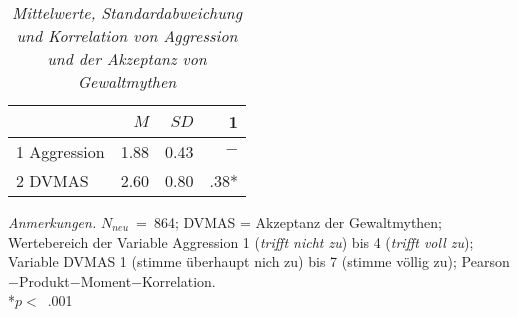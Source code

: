 \begin{table}[htb]
    \caption[Mittelwerte, Standardabweichung und Korrelation von Aggression und der Akzeptanz von Gewaltmythen]{\textit {Mittelwerte, Standardabweichung und Korrelation von Aggression und der Akzeptanz von Gewaltmythen}} 
    \label{H2_Pearson}
    \centering
    \begin{adjustbox}{width=5.5cm} %
    \small
    \begin{tabular}{lrrr}
      \hline
        & $M$   & $SD$ & 1 \\
      \hline
    1 Aggression      & 1.88 & 0.43  & $-$      \\
    2 DVMAS           & 2.60 & 0.80  & .38*      \\
       \hline
    \end{tabular}
    \end{adjustbox}
    
    \begin{tablenotes}
        \item \textit{Anmerkungen.} \( N_{neu} \)~=~864; DVMAS = Akzeptanz der Gewaltmythen; Wertebereich der Variable Aggression 1 (\textit{trifft nicht zu}) bis 4 (\textit{trifft voll zu}); Variable DVMAS 1 (stimme überhaupt nich zu) bis 7 (stimme völlig zu); Pearson$-$Produkt$-$Moment$-$Korrelation. \\ *$p<$~.001
      \end{tablenotes}
    \end{table}

